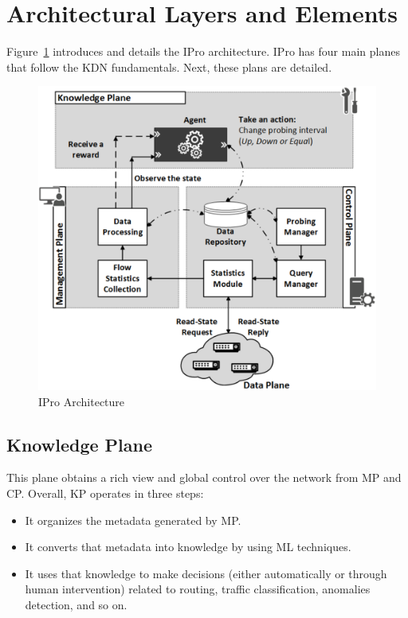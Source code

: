 \section{Architectural Layers and Elements}
\label{sec:detailed_architecture}

Figure~\ref{fig:detail_ipro} introduces and details the IPro architecture. IPro has four main planes that follow the KDN fundamentals. Next, these plans are detailed.

\begin{figure}[h!]
    \centering
    \includegraphics[width=0.60\columnwidth]{figures/Fig2-IPro-architecture}
    \caption{IPro Architecture}
    \label{fig:detail_ipro}
\end{figure}

\subsection{Knowledge Plane}
This plane obtains a rich view and global control over the network from MP and CP. Overall, KP operates in three steps:
\begin{itemize}
    \item It organizes the metadata generated by MP.
    \item It converts that metadata into knowledge by using ML techniques.
    \item It uses that knowledge to make decisions (either automatically or through human intervention) related to routing, traffic classification, anomalies detection, and so on. 
\end{itemize}{}

